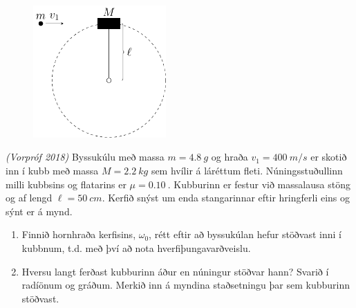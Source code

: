 \ifdefined \wholebook \else\documentclass[oneside]{book}\usepackage{EdlBook}\graphicspath{{figures/}}
\begin{document}
\begin{enumerate}[label = \textbf{Dæmi \thechapter.\arabic*.}]
\vspace{0.5cm}

\begin{minipage}{\linewidth}

\begin{figure}
\vspace{-1cm}
\includegraphics[width=2in]{images/angular_test.pdf}
\end{figure}

\item \textit{(Vorpróf 2018)} Byssukúlu með massa $m = \SI{4.8}{g}$ og hraða $v_1 = \SI{400}{m/s}$ er skotið inn í kubb með massa $M = \SI{2.2}{kg}$ sem hvílir á láréttum fleti. Núningsstuðullinn milli kubbsins og flatarins er $\mu = \SI{0.10}{}$. Kubburinn er festur við massalausa stöng og af lengd $\ell = \SI{50}{cm}$. Kerfið snýst um enda stangarinnar eftir hringferli eins og sýnt er á mynd.

\vspace{0.2cm}

\begin{enumerate}[label = \textbf{(\alph*)}]
    \item Finnið hornhraða kerfisins, $\omega_0$, rétt eftir að byssukúlan hefur stöðvast inni í kubbnum, t.d. með því að nota hverfiþungavarðveislu.
    \item Hversu langt ferðast kubburinn áður en núningur stöðvar hann? Svarið í radíönum og gráðum. Merkið inn á myndina staðsetningu þar sem kubburinn stöðvast.
\end{enumerate}
\end{minipage}

\vspace{0.5cm}

\begin{minipage}{\linewidth}


\end{minipage}
\end{enumerate}
\end{document}
